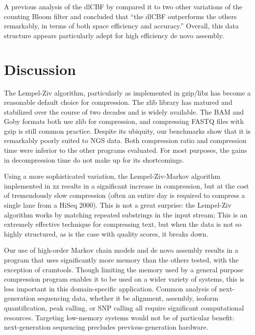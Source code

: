 \documentclass[twocolumn]{article}
\begin{document}
A previous analysis of the dlCBF by \citet{Zhang2009} compared it to two other
variations of the counting Bloom filter and concluded that ``the dlCBF
outperforms the others remarkably, in terms of both space efficiency and
accuracy.'' Overall, this data structure appears particularly adept for high
efficiency de novo assembly.

\section{Discussion}



The Lempel-Ziv algorithm, particularly as implemented in gzip/libz has become
a reasonable default choice for compression. The zlib library has matured and stabilized
over the course of two decades and is widely available. The BAM and Goby
formats both use zlib for compression, and compressing FASTQ files with gzip
is still common practice. Despite its ubiquity, our benchmarks show that it is
remarkably poorly suited to NGS data. Both compression ratio and compression
time were inferior to the other programs evaluated. For most purposes, the
gains in decompression time do not make up for its shortcomings.

Using a more sophisticated variation, the Lempel-Ziv-Markov algorithm
implemented in xz results in a significant increase in compression, but at the
cost of tremendously slow compression (often an entire day is required to
compress a single lane from a HiSeq 2000). This is not a great surprise: the
Lempel-Ziv algorithm works by matching repeated substrings in the input
stream; This is an extremely effective technique for compressing text, but
when the data is not so highly structured, as is the case with quality scores,
it breaks down.




Our use of high-order Markov chain models and de novo assembly results in a
program that uses significantly more memory than the others tested, with the
exception of cramtools. Though limiting the memory used by a general purpose
compression program enables it to be used on a wider variety of systems, this
is less important in this domain-specific application. Common analysis of
next-generation sequencing data, whether it be alignment, assembly, isoform
quantification, peak calling, or SNP calling all require significant
computational resources. Targeting low-memory systems would not be of
particular benefit: next-generation sequencing precludes previous-generation
hardware.
\end{document}
